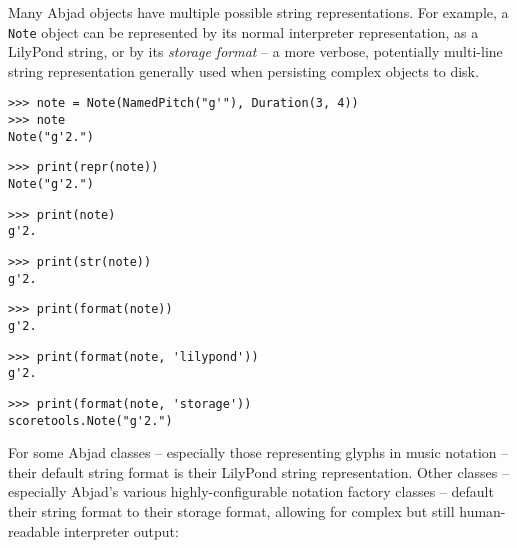 \noindent Many Abjad objects have multiple possible string representations. For
example, a \texttt{Note} object can be represented by its normal interpreter
representation, as a LilyPond string, or by its \emph{storage format} -- a more
verbose, potentially multi-line string representation generally used when
persisting complex objects to disk.

\begin{comment}
<abjad>
note = Note(NamedPitch("g'"), Duration(3, 4))
note
print(repr(note))
print(note)
print(str(note))
print(format(note))
print(format(note, 'lilypond'))
print(format(note, 'storage'))
</abjad>
\end{comment}

\begin{abjadbookoutput}
\begin{singlespacing}
\vspace{-0.5\baselineskip}
\begin{verbatim}
>>> note = Note(NamedPitch("g'"), Duration(3, 4))
>>> note
Note("g'2.")
\end{verbatim}
\begin{verbatim}
>>> print(repr(note))
Note("g'2.")
\end{verbatim}
\begin{verbatim}
>>> print(note)
g'2.
\end{verbatim}
\begin{verbatim}
>>> print(str(note))
g'2.
\end{verbatim}
\begin{verbatim}
>>> print(format(note))
g'2.
\end{verbatim}
\begin{verbatim}
>>> print(format(note, 'lilypond'))
g'2.
\end{verbatim}
\begin{verbatim}
>>> print(format(note, 'storage'))
scoretools.Note("g'2.")
\end{verbatim}
\end{singlespacing}
\end{abjadbookoutput}

\noindent For some Abjad classes -- especially those representing glyphs in
music notation -- their default string format is their LilyPond string
representation. Other classes -- especially Abjad's various highly-configurable
notation factory classes -- default their string format to their storage
format, allowing for complex but still human-readable interpreter output:

